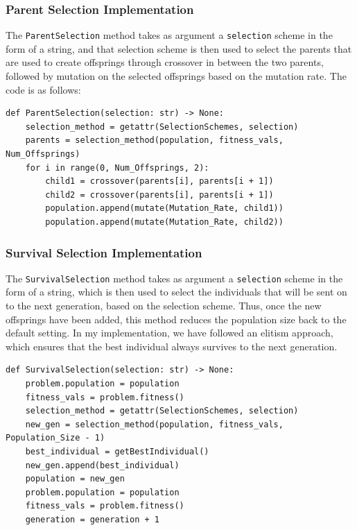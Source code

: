 \documentclass{article}
\theoremstyle{mytheoremstyle}
\theoremstyle{mytheoremstyle}
\theoremstyle{myproblemstyle}
\begin{document}
\subsubsection{Parent Selection Implementation}
The \texttt{ParentSelection} method takes as argument a \texttt{selection} scheme in the form of a string, and that selection scheme is then used to select the parents that are used to create offsprings through crossover in between the two parents, followed by mutation on the selected offsprings based on the mutation rate. The code is as follows:
\begin{lstlisting}[label={parent}, caption={Parent Selection Algorithm}]
def ParentSelection(selection: str) -> None:
    selection_method = getattr(SelectionSchemes, selection)
    parents = selection_method(population, fitness_vals, Num_Offsprings)
    for i in range(0, Num_Offsprings, 2):
        child1 = crossover(parents[i], parents[i + 1])
        child2 = crossover(parents[i], parents[i + 1])
        population.append(mutate(Mutation_Rate, child1))
        population.append(mutate(Mutation_Rate, child2))
\end{lstlisting}

\subsubsection{Survival Selection Implementation}
The \texttt{SurvivalSelection} method takes as argument a \texttt{selection} scheme in the form of a string, which is then used to select the individuals that will be sent on to the next generation, based on the selection scheme. Thus, once the new offsprings have been added, this method reduces the population size back to the default setting. In my implementation, we have followed an elitism approach, which ensures that the best individual always survives to the next generation.
\begin{lstlisting}[label=survival, caption={Survival Selection Algorithm}]
def SurvivalSelection(selection: str) -> None:
    problem.population = population
    fitness_vals = problem.fitness()
    selection_method = getattr(SelectionSchemes, selection)
    new_gen = selection_method(population, fitness_vals, Population_Size - 1)
    best_individual = getBestIndividual()
    new_gen.append(best_individual)
    population = new_gen
    problem.population = population
    fitness_vals = problem.fitness()
    generation = generation + 1
\end{lstlisting}
\end{document}

